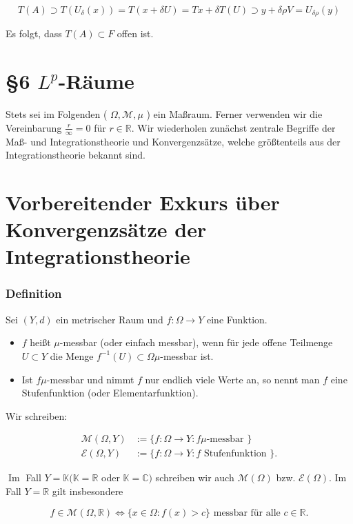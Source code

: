 \documentclass[10pt, letterpaper]{article}
\begin{document}
$$
T(A) \supset T\left(U_{\delta}(x)\right)=T(x+\delta U)=T x+\delta T(U) \supset y+\delta \rho V=U_{\delta \rho}(y)
$$

Es folgt, dass $T(A) \subset F$ offen ist.

\section*{§6 $L^{p}$-Räume}
Stets sei im Folgenden ( $\Omega, \mathcal{M}, \mu$ ) ein Maßraum. Ferner verwenden wir die Vereinbarung $\frac{r}{\infty}=0$ für $r \in \mathbb{R}$. Wir wiederholen zunächst zentrale Begriffe der Maß- und Integrationstheorie und Konvergenzsätze, welche größtenteils aus der Integrationstheorie bekannt sind.

\section*{Vorbereitender Exkurs über Konvergenzsätze der Integrationstheorie}
\subsubsection*{Definition}
Sei $(Y, d)$ ein metrischer Raum und $f: \Omega \rightarrow Y$ eine Funktion.

\begin{itemize}
  \item $f$ heißt $\mu$-messbar (oder einfach messbar), wenn für jede offene Teilmenge $U \subset Y$ die Menge $f^{-1}(U) \subset \Omega \mu$-messbar ist.
  \item Ist $f \mu$-messbar und nimmt $f$ nur endlich viele Werte an, so nennt man $f$ eine Stufenfunktion (oder Elementarfunktion).
\end{itemize}

Wir schreiben:

$$
\begin{aligned}
\mathcal{M}(\Omega, Y) & :=\{f: \Omega \rightarrow Y: f \mu \text {-messbar }\} \\
\mathcal{E}(\Omega, Y) & :=\{f: \Omega \rightarrow Y: f \text { Stufenfunktion }\} .
\end{aligned}
$$

$\operatorname{Im}$ Fall $Y=\mathbb{K}(\mathbb{K}=\mathbb{R}$ oder $\mathbb{K}=\mathbb{C})$ schreiben wir auch $\mathcal{M}(\Omega)$ bzw. $\mathcal{E}(\Omega)$. Im Fall $Y=\mathbb{R}$ gilt insbesondere

$$
f \in \mathcal{M}(\Omega, \mathbb{R}) \Longleftrightarrow\{x \in \Omega: f(x)>c\} \text { messbar für alle } c \in \mathbb{R} .
$$
\end{document}
